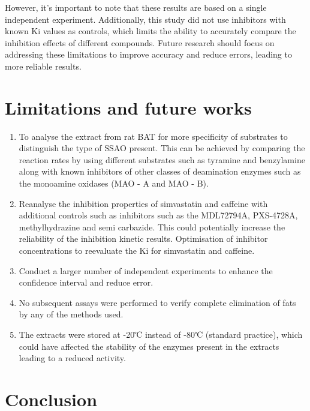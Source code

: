 \documentclass[
  letterpaper,
  DIV=11,
  numbers=noendperiod]{scrreprt}
\providecommand{\tightlist}{%
  \setlength{\itemsep}{0pt}\setlength{\parskip}{0pt}}\usepackage{longtable,booktabs,array}
\begin{document}
However, it's important to note that these results are based on a single
independent experiment. Additionally, this study did not use inhibitors
with known Ki values as controls, which limits the ability to accurately
compare the inhibition effects of different compounds. Future research
should focus on addressing these limitations to improve accuracy and
reduce errors, leading to more reliable results.


\chapter{Limitations and future
works}\label{limitations-and-future-works}

\begin{enumerate}
\def\labelenumi{\arabic{enumi}.}
\tightlist
\item
  To analyse the extract from rat BAT for more specificity of substrates
  to distinguish the type of SSAO present. This can be achieved by
  comparing the reaction rates by using different substrates such as
  tyramine and benzylamine along with known inhibitors of other classes
  of deamination enzymes such as the monoamine oxidases (MAO - A and MAO
  - B).
\item
  Reanalyse the inhibition properties of simvastatin and caffeine with
  additional controls such as inhibitors such as the MDL72794A,
  PXS-4728A, methylhydrazine and semi carbazide. This could potentially
  increase the reliability of the inhibition kinetic results.
  Optimisation of inhibitor concentrations to reevaluate the Ki for
  simvastatin and caffeine.
\item
  Conduct a larger number of independent experiments to enhance the
  confidence interval and reduce error.
\item
  No subsequent assays were performed to verify complete elimination of
  fats by any of the methods used.
\item
  The extracts were stored at -20℃ instead of -80℃ (standard practice),
  which could have affected the stability of the enzymes present in the
  extracts leading to a reduced activity.
\end{enumerate}


\chapter{Conclusion}\label{conclusion}
\end{document}
